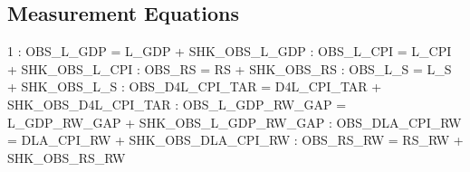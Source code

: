 \documentclass{article}%
\begin{document}
%
\subsection{Measurement Equations}%
\label{subsec:MeasurementEquations}%
 1    :  OBS\_L\_GDP        = L\_GDP + SHK\_OBS\_L\_GDP\newline%
    :  OBS\_L\_CPI        = L\_CPI + SHK\_OBS\_L\_CPI\newline%
    :  OBS\_RS           = RS  + SHK\_OBS\_RS\newline%
    :  OBS\_L\_S          = L\_S + SHK\_OBS\_L\_S\newline%
    :  OBS\_D4L\_CPI\_TAR  = D4L\_CPI\_TAR + SHK\_OBS\_D4L\_CPI\_TAR\newline%
    :  OBS\_L\_GDP\_RW\_GAP = L\_GDP\_RW\_GAP + SHK\_OBS\_L\_GDP\_RW\_GAP\newline%
    :  OBS\_DLA\_CPI\_RW   = DLA\_CPI\_RW + SHK\_OBS\_DLA\_CPI\_RW\newline%
    :  OBS\_RS\_RW        = RS\_RW + SHK\_OBS\_RS\_RW\newline%

%
\end{document}
